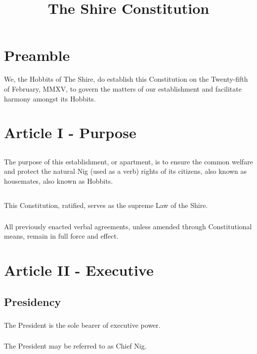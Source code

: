 \documentclass[]{article}
\begin{document}
\title{The Shire Constitution}
\author{}
\date{}
\maketitle
\tableofcontents
\newpage

\section{Preamble}
We, the Hobbits of The Shire, do establish this Constitution on the Twenty-fifth of February, MMXV, to govern the matters of our establishment and facilitate harmony amongst its Hobbits.

\section{Article I - Purpose}
\subsection{}
The purpose of this establishment, or apartment, is to ensure the common welfare and protect the natural Nig (used as a verb) rights of its citizens, also known as housemates, also known as Hobbits.
\subsection{}
This Constitution, ratified, serves as the supreme Law of the Shire.
\subsubsection{}
All previously enacted verbal agreements, unless amended through Constitutional means, remain in full force and effect.

\section{Article II - Executive}
\subsection{Presidency}
\subsubsection{}
The President is the sole bearer of executive power.
\subsubsection{}
The President may be referred to as Chief Nig.  
\end{document}
